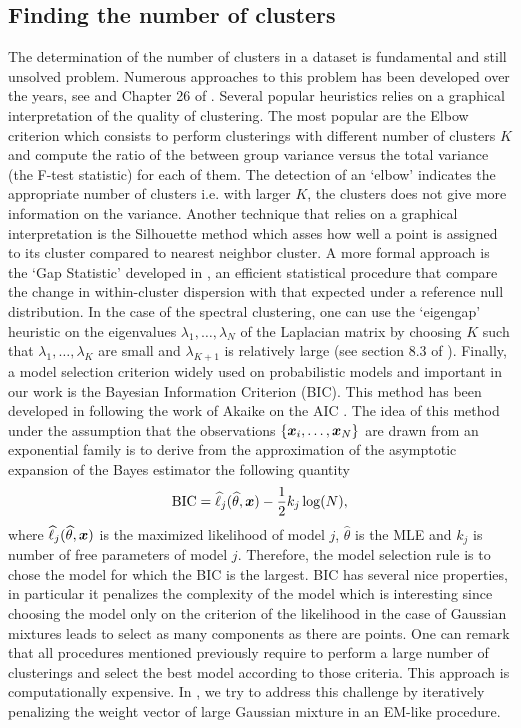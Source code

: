 \subsection{Finding the number of clusters}
\label{sec:finding_clusters_nb}
The determination of the number of clusters in a dataset is fundamental and still unsolved problem. Numerous approaches to this problem has been developed over the years, see \citep{Hardy:1996:NC:255810.255820,Milligan1985} and Chapter 26 of \citep{hennig2015handbook}. Several popular heuristics relies on a graphical interpretation of the quality of clustering. The most popular are the Elbow criterion which consists to perform clusterings with different number of clusters $K$ and compute the ratio of the between group variance versus the total variance (the F-test statistic) for each of them. The detection of an `elbow' indicates the appropriate number of clusters i.e. with larger $K$, the clusters does not give more information on the variance. Another technique that relies on a graphical interpretation is the Silhouette method \citep{Rousseeuw:1987:SGA:38768.38772} which asses how well a point is assigned to its cluster compared to nearest neighbor cluster. A more formal approach is the `Gap Statistic' developed in \citep{gap_stat_tibsh_2001}, an efficient statistical procedure that compare the change in within-cluster dispersion with that expected under a reference null distribution. In the case of the spectral clustering, one can use the `eigengap' heuristic on the eigenvalues $\lambda_1,\dots,\lambda_N$ of the Laplacian matrix by choosing $K$ such that $\lambda_1,\dots,\lambda_K$ are small and $\lambda_{K+1}$ is relatively large (see section 8.3 of \citep{Luxburg:2007:TSC:1288822.1288832}). Finally, a model selection criterion widely used on probabilistic models and important in our work is the Bayesian Information Criterion (BIC). This method has been developed in \citep{schwarz1978} following the work of Akaike on the AIC \citep{Akaike1998}. The idea of this method under the assumption that the observations $\{\boldsymbol x_i,\dots,\boldsymbol x_N\}$ are drawn from an exponential family is to derive from the approximation of the asymptotic expansion of the Bayes estimator the following quantity
\begin{equation}
  \textnormal{BIC} = \widehat\ell_j(\widehat\theta,\boldsymbol x)-\frac{1}{2}k_j\log(N),
\end{equation}
where $\widehat\ell_j(\widehat\theta,\boldsymbol x)$ is the maximized likelihood of model $j$, $\hat\theta$ is the MLE and $k_j$ is number of free parameters of model $j$. Therefore, the model selection rule is to chose the model for which the BIC is the largest. BIC has several nice properties, in particular it penalizes the complexity of the model which is interesting since choosing the model only on the criterion of the{} likelihood in the case of Gaussian mixtures leads to select as many components as there are points. One can remark that all procedures mentioned previously require to perform a large number of clusterings and select the best model according to those criteria. This approach is computationally expensive. In , we try to address this challenge by iteratively penalizing the weight vector of large Gaussian mixture in an EM-like procedure.
